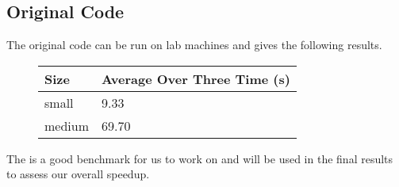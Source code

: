 \subsection*{Original Code}
The original code can be run on lab machines and gives the following results.\\
\begin{figure}[H]\centering \begin{tabular}{ l | l }
  \hline
  Size & Average Over Three Time (s) \\
  \hline
  \hline
  small & 9.33 \\
  medium & 69.70 \\
  \hline
\end{tabular} \end{figure}

The is a good benchmark for us to work on and will be used in the final results to assess our overall speedup.